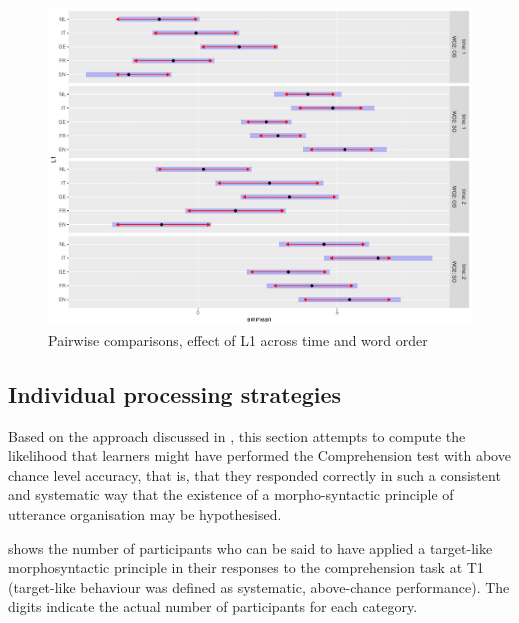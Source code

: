 \begin{figure}
    \includegraphics[width=\textwidth]{figures/05-4.pdf}
    \caption{Pairwise comparisons, effect of L1 across time and word order}
    \label{fig:05:4}
\end{figure}

\subsection{Individual processing strategies}\label{sec:05:2.3}

Based on the approach discussed in , this section attempts to compute the likelihood that learners might have performed the Comprehension test with above chance level accuracy, that is, that they responded correctly in such a consistent and systematic way that the existence of a morpho-syntactic principle of utterance organisation may be hypothesised.

 shows the number of participants who can be said to have applied a target-like morphosyntactic principle in their responses to the comprehension task at T1 (target-like behaviour was defined as systematic, above-chance performance). The digits indicate the actual number of participants for each category.

